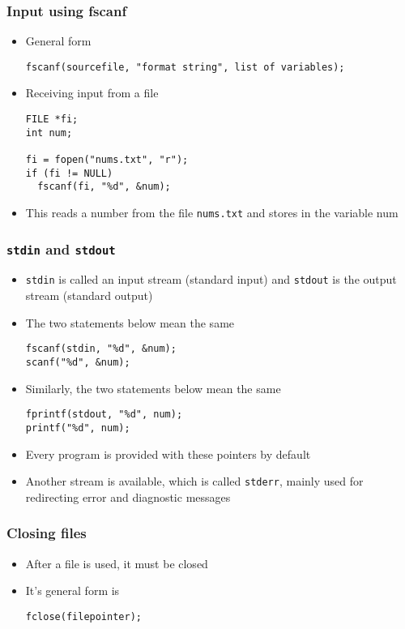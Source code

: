 \documentclass[11pt]{beamer}
\begin{document}
\begin{frame}[fragile]\frametitle{Input using fscanf}
\label{sec-1-15}

\begin{itemize}
\item General form

\begin{verbatim}
fscanf(sourcefile, "format string", list of variables);
\end{verbatim}
\item Receiving input from a file

\begin{verbatim}
FILE *fi;
int num;

fi = fopen("nums.txt", "r");
if (fi != NULL)
  fscanf(fi, "%d", &num);
\end{verbatim}
\item This reads a number from the file \verb~nums.txt~ and stores in the variable num
\end{itemize}
\end{frame}
\begin{frame}[fragile]\frametitle{\verb~stdin~ and \verb~stdout~}
\label{sec-1-16}

\begin{itemize}
\item \verb~stdin~ is called an input stream (standard input) and \verb~stdout~ is the output stream (standard output)
\item The two statements below mean the same

\begin{verbatim}
fscanf(stdin, "%d", &num);
scanf("%d", &num);
\end{verbatim}
\item Similarly, the two statements below mean the same

\begin{verbatim}
fprintf(stdout, "%d", num);
printf("%d", num);
\end{verbatim}
\item Every program is provided with these pointers by default
\item Another stream is available, which is called \verb~stderr~, mainly used for redirecting error and diagnostic messages
\end{itemize}
\end{frame}
\begin{frame}[fragile]\frametitle{Closing files}
\label{sec-1-17}

\begin{itemize}
\item After a file is used, it must be closed
\item It's general form is

\begin{verbatim}
fclose(filepointer);
\end{verbatim}
\end{itemize}
\end{frame}
\end{document}
